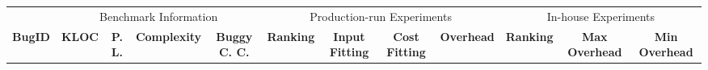 \begin{table*}[h!]
  \centering
  \scriptsize
  {
  \newcommand{\Yes}[1]{\checkmark{}$_#1$}
  \newcommand{\No}[0]{-}
  {
  \begin{tabular}{lcccc|cccc|ccc}
    \toprule
        & \multicolumn{4}{c}{Benchmark Information} & \multicolumn{4}{c}{Production-run Experiments} & \multicolumn{3}{c}{In-house Experiments}   \\

    \cmidrule(lr){2-5}
    \cmidrule(lr){6-9}
    \cmidrule(lr){10-12}
    {\bf BugID}    & {\bf KLOC} & {\bf P. L.} & {\bf Complexity} & {\bf Buggy C. C.} & {\bf Ranking} & {\bf Input Fitting} & {\bf Cost Fitting} & {\bf Overhead} & {\bf Ranking} & {\bf Max Overhead} & {\bf Min Overhead} \\
    \midrule


\end{tabular}}}
\end{table*}
